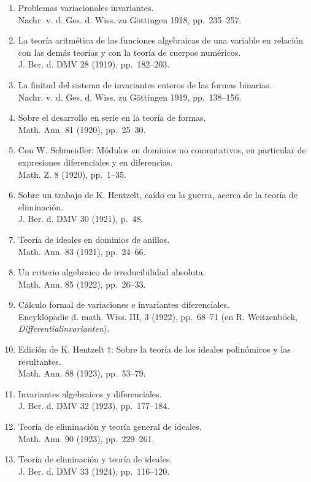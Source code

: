 \begin{enumerate}
\item Problemas variacionales invariantes.\\ Nachr. v. d. Ges. d. Wiss. zu Göttingen 1918, pp.~235--257.
\item La teoría aritmética de las funciones algebraicas de una variable en relación con las demás teorías y con la teoría de cuerpos numéricos.\\ J. Ber. d. DMV 28 (1919), pp.~182--203.
\item La finitud del sistema de invariantes enteros de las formas binarias.\\ Nachr. v. d. Ges. d. Wiss. zu Göttingen 1919, pp.~138--156.
\item Sobre el desarrollo en serie en la teoría de formas.\\ Math. Ann. 81 (1920), pp.~25--30.
\item Con W. Schmeidler: Módulos en dominios no conmutativos, en particular de expresiones diferenciales y en diferencias.\\ Math. Z. 8 (1920), pp.~1--35.
\item Sobre un trabajo de K. Hentzelt, caído en la guerra, acerca de la teoría de eliminación.\\ J. Ber. d. DMV 30 (1921), p.~48.
\item Teoría de ideales en dominios de anillos.\\ Math. Ann. 83 (1921), pp.~24--66.
\item Un criterio algebraico de irreducibilidad absoluta.\\ Math. Ann. 85 (1922), pp.~26--33.
\item Cálculo formal de variaciones e invariantes diferenciales.\\ Encyklopädie d. math. Wiss. III, 3 (1922), pp.~68--71 (en R. Weitzenböck, \emph{Differentialinvarianten}).
\item Edición de K. Hentzelt $\dagger$: Sobre la teoría de los ideales polinómicos y las resultantes.\\ Math. Ann. 88 (1923), pp.~53--79.
\item Invariantes algebraicos y diferenciales.\\ J. Ber. d. DMV 32 (1923), pp.~177--184.
\item Teoría de eliminación y teoría general de ideales.\\ Math. Ann. 90 (1923), pp.~229--261.
\item Teoría de eliminación y teoría de ideales.\\ J. Ber. d. DMV 33 (1924), pp.~116--120.

\end{enumerate}
